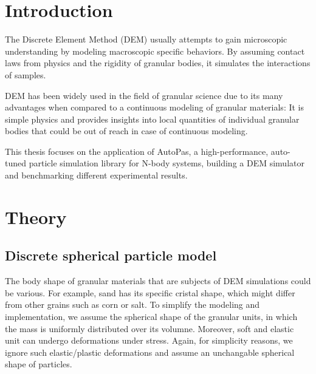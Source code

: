 \documentclass[11pt,
               a4paper,
               bibtotoc,
               idxtotoc,
               headsepline,
               footsepline,
               footexclude,
               BCOR12mm,
               DIV13,
               openany,   %
               ]
               {scrbook}
\begin{document}
\lipsum[2]

\cleardoublepage


\tableofcontents
\thispagestyle{empty}
\cleardoubleemptypage


\mainmatter
\part{Introduction}
\label{sec:introduction}
The Discrete Element Method (DEM) usually attempts to gain microscopic understanding by modeling macroscopic specific behaviors. By assuming contact laws from physics and the rigidity of granular bodies, it simulates the interactions of samples. 

DEM has been widely used in the field of granular science due to its many advantages  when compared to a continuous modeling of granular materials: It is simple physics and provides insights into local quantities of individual granular bodies that could be out of reach in case of continuous modeling.

This thesis focuses on the application of AutoPas, a high-performance, auto-tuned particle simulation library for N-body systems, building a DEM simulator and benchmarking different experimental results.

\part{Theory}
\chapter{Discrete spherical particle model}
\label{sec:discrete_spherical_particle_model}

The body shape of granular materials that are subjects of DEM simulations could be various. For example, sand has its specific cristal shape, which might differ from other grains such as corn or salt. 
To simplify the modeling and implementation, we assume the spherical shape of the granular units, in which the mass is uniformly distributed over its volumne.
Moreover, soft and elastic unit can undergo deformations under stress. Again, for simplicity reasons, we ignore such elastic/plastic deformations and assume an unchangable spherical shape of particles.
\end{document}
